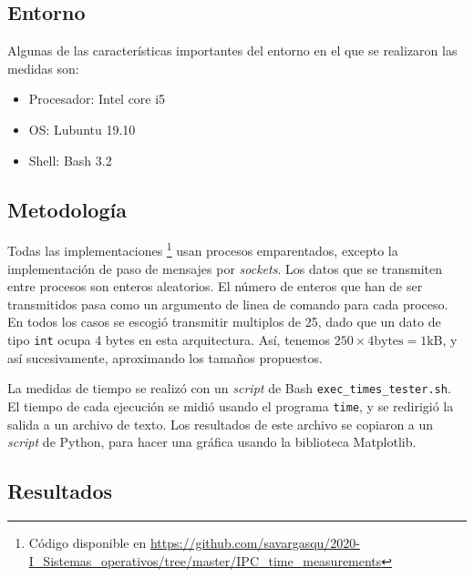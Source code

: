 \subsection{Entorno}

Algunas de las características importantes del entorno en el que se realizaron las medidas son:
\begin{itemize}\tightlist
  \item Procesador: Intel core i5
  \item OS: Lubuntu 19.10
  \item Shell: Bash 3.2
\end{itemize}

\subsection{Metodología}

Todas las implementaciones
\footnote{Código disponible en
\url{https://github.com/savargasqu/2020-I_Sistemas_operativos/tree/master/IPC_time_measurements}}
usan procesos emparentados,
excepto la implementación de paso de mensajes por \emph{sockets}.
Los datos que se transmiten entre procesos son enteros aleatorios.
El número de enteros que han de ser transmitidos pasa como un argumento de linea de comando para cada proceso.
En todos los casos se escogió transmitir multiplos de 25,
dado que un dato de tipo \texttt{int} ocupa 4 bytes en esta arquitectura.
Así, tenemos $250 \times 4 \text{bytes} = 1 \text{kB}$, y así sucesivamente,
aproximando los tamaños propuestos.

La medidas de tiempo se realizó con un \emph{script} de Bash \texttt{exec\_times\_tester.sh}.
El tiempo de cada ejecución se midió usando el programa \texttt{time},
y se redirigió la salida a un archivo de texto.
Los resultados de este archivo se copiaron a un \emph{script} de Python,
para hacer una gráfica usando la biblioteca Matplotlib.

\hypertarget{resultados}{%
\subsection{Resultados}\label{resultados}}

